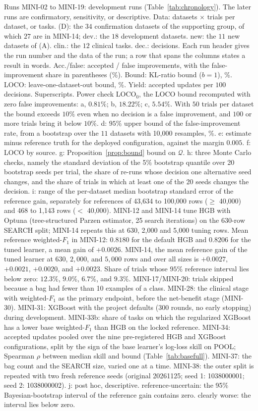 \begin{table}[!t]
\vspace{2pt}
\parbox{\textwidth}{\justifying\scriptsize *Runs MINI-02 to MINI-19: development runs (Table~\ref{tab:chronology}). The later runs are confirmatory, sensitivity, or descriptive. Data: datasets $\times$ trials per dataset, or tasks. (D): the $34$ confirmation datasets of the supporting group, of which $27$ are in MINI-14; dev.: the $18$ development datasets. new: the $11$ new datasets of (A). clin.: the $12$ clinical tasks. dec.: decisions. Each run header gives the run number and the data of the run; a row that spans the columns states a result in words. Acc./false: accepted / false improvements, with the false-improvement share in parentheses (\%). Bound: KL-ratio bound ($b=1$), \%. LOCO: leave-one-dataset-out bound, \%. Yield: accepted updates per $100$ decisions. Superscripts. Power check LOCO$_0$, the LOCO bound recomputed with zero false improvements: a, $0.81\%$; b, $18.22\%$; c, $5.54\%$. With $50$ trials per dataset the bound exceeds $10\%$ even when no decision is a false improvement, and $100$ or more trials bring it below $10\%$. d: $95\%$ upper bound of the false-improvement rate, from a bootstrap over the $11$ datasets with 10,000 resamples, \%. e: estimate minus reference truth for the deployed configuration, against the margin $0.005$. f: LOCO by source. g: Proposition~\ref{prop:bound} bound on $\mathcal{Q}$. h: three Monte Carlo checks, namely the standard deviation of the 5\% bootstrap quantile over 20 bootstrap seeds per trial, the share of re-runs whose decision one alternative seed changes, and the share of trials in which at least one of the 20 seeds changes the decision. i: range of the per-dataset median bootstrap standard error of the reference gain, separately for references of 43,634 to 100,000 rows ($\ge$ 40,000) and 468 to 1,143 rows ($<$ 40,000). MINI-12 and MINI-14 tune HGB with Optuna (tree-structured Parzen estimator, 25 search iterations) on the 630-row SEARCH split; MINI-14 repeats this at 630, 2,000 and 5,000 tuning rows. Mean reference weighted-$F_1$ in MINI-12: $0.8180$ for the default HGB and $0.8206$ for the tuned learner, a mean gain of $+0.0026$. MINI-14, the mean reference gain of the tuned learner at $630$, $2{,}000$, and $5{,}000$ rows and over all sizes is $+0.0027$, $+0.0021$, $+0.0020$, and $+0.0023$. Share of trials whose $95\%$ reference interval lies below zero: $12.3\%$, $9.0\%$, $6.7\%$, and $9.3\%$. MINI-17/MINI-20: trials skipped because a bag had fewer than 10 examples of a class. MINI-28: the clinical stage with weighted-$F_1$ as the primary endpoint, before the net-benefit stage (MINI-30). MINI-31: XGBoost with the project defaults (300 rounds, no early stopping) during development. MINI-33b: share of tasks on which the regularized XGBoost has a lower base weighted-$F_1$ than HGB on the locked reference. MINI-34: accepted updates pooled over the nine pre-registered HGB and XGBoost configurations, split by the sign of the base learner's log-loss skill on POOL; Spearman $\rho$ between median skill and bound (Table~\ref{tab:basefull}). MINI-37: the bag count and the SEARCH size, varied one at a time. MINI-38: the outer split is repeated with two fresh reference seeds (original 20261125; seed 1: 1038000001; seed 2: 1038000002). j: post hoc, descriptive. reference-uncertain: the 95\% Bayesian-bootstrap interval of the reference gain contains zero. clearly worse: the interval lies below zero.}
\end{table}
